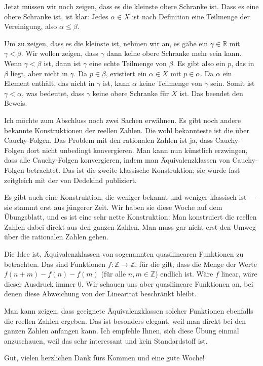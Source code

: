 \begin{spoken-clean}[00:55:29 - 00:58:07]
Jetzt müssen wir noch zeigen, dass es die kleinste obere Schranke ist. Dass es eine obere Schranke ist, ist klar: Jedes $\alpha \in X$ ist nach Definition eine Teilmenge der Vereinigung, also $\alpha \le \beta$.

Um zu zeigen, dass es die kleinste ist, nehmen wir an, es gäbe ein $\gamma \in \mathbb{R}$ mit $\gamma < \beta$. Wir wollen zeigen, dass $\gamma$ dann keine obere Schranke mehr sein kann. Wenn $\gamma < \beta$ ist, dann ist $\gamma$ eine echte Teilmenge von $\beta$. Es gibt also ein $p$, das in $\beta$ liegt, aber nicht in $\gamma$. Da $p \in \beta$, existiert ein $\alpha \in X$ mit $p \in \alpha$. Da $\alpha$ ein Element enthält, das nicht in $\gamma$ ist, kann $\alpha$ keine Teilmenge von $\gamma$ sein. Somit ist $\gamma < \alpha$, was bedeutet, dass $\gamma$ keine obere Schranke für $X$ ist. Das beendet den Beweis.

Ich möchte zum Abschluss noch zwei Sachen erwähnen. Es gibt noch andere bekannte Konstruktionen der reellen Zahlen. Die wohl bekannteste ist die über Cauchy-Folgen. Das Problem mit den rationalen Zahlen ist ja, dass Cauchy-Folgen dort nicht unbedingt konvergieren. Man kann nun künstlich erzwingen, dass alle Cauchy-Folgen konvergieren, indem man Äquivalenzklassen von Cauchy-Folgen betrachtet. Das ist die zweite klassische Konstruktion; sie wurde fast zeitgleich mit der von Dedekind publiziert.
\end{spoken-clean}

\begin{spoken-clean}[00:58:07 - 01:02:09]
Es gibt auch eine Konstruktion, die weniger bekannt und weniger klassisch ist --- sie stammt erst aus jüngerer Zeit. Wir haben sie diese Woche auf dem Übungsblatt, und es ist eine sehr nette Konstruktion: Man konstruiert die reellen Zahlen dabei direkt aus den ganzen Zahlen. Man muss gar nicht erst den Umweg über die rationalen Zahlen gehen.

Die Idee ist, Äquivalenzklassen von sogenannten quasilinearen Funktionen zu betrachten. Das sind Funktionen $f \colon \mathbb{Z} \to \mathbb{Z}$, für die gilt, dass die Menge der Werte $f(n+m) - f(n) - f(m)$ (für alle $n, m \in \mathbb{Z}$) endlich ist. Wäre $f$ linear, wäre dieser Ausdruck immer $0$. Wir schauen uns aber quasilineare Funktionen an, bei denen diese Abweichung von der Linearität beschränkt bleibt.

Man kann zeigen, dass geeignete Äquivalenzklassen solcher Funktionen ebenfalls die reellen Zahlen ergeben. Das ist besonders elegant, weil man direkt bei den ganzen Zahlen anfangen kann. Ich empfehle Ihnen, sich diese Übung einmal anzuschauen, weil das sehr interessant und kein Standardstoff ist.

Gut, vielen herzlichen Dank fürs Kommen und eine gute Woche!
\end{spoken-clean}

